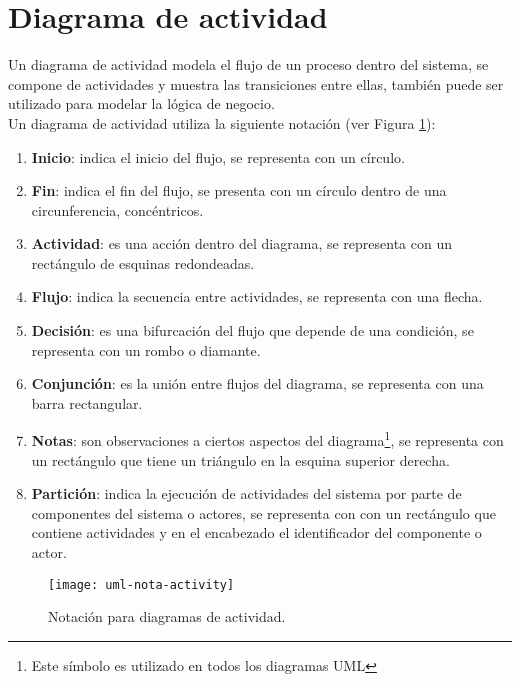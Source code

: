 \section{Diagrama de actividad}\label{sec-uml-act}
Un diagrama de actividad modela el flujo de un proceso dentro del sistema, se compone de actividades y muestra las transiciones entre ellas, también puede ser utilizado para modelar la lógica de negocio\cite{UMLClassroom, SoftwareEngineeringUML}.\\
Un diagrama de actividad utiliza la siguiente notación\cite{UMLClassroom, SoftwareEngineeringUML} (ver Figura \ref{fig:uml-nota-activity}):
\begin{enumerate}
  \item \textbf{Inicio}: indica el inicio del flujo, se representa con un círculo.
  \item \textbf{Fin}: indica el fin del flujo, se presenta con un círculo dentro de una circunferencia, concéntricos.
  \item \textbf{Actividad}: es una acción dentro del diagrama, se representa con un rectángulo de esquinas redondeadas.
  \item \textbf{Flujo}: indica la secuencia entre actividades, se representa con una flecha.
  \item \textbf{Decisión}: es una bifurcación del flujo que depende de una condición, se representa con un rombo o diamante.
  \item \textbf{Conjunción}: es la unión entre flujos del diagrama, se representa con una barra rectangular.
  \item \textbf{Notas}: son observaciones a ciertos aspectos del diagrama\footnote{Este símbolo es utilizado en todos los diagramas UML}, se representa con un rectángulo que tiene un triángulo en la esquina superior derecha.
  \item \textbf{Partición}: indica la ejecución de actividades del sistema por parte de componentes del sistema o actores, se representa con con un rectángulo que contiene actividades y en el encabezado el identificador del componente o actor.
\end{enumerate}

\begin{figure}[h]
  \centering
  \texttt{[image: uml-nota-activity]}
  \caption{Notación para diagramas de actividad\cite{SoftwareEngineeringUML}.}
  \label{fig:uml-nota-activity}
\end{figure}

